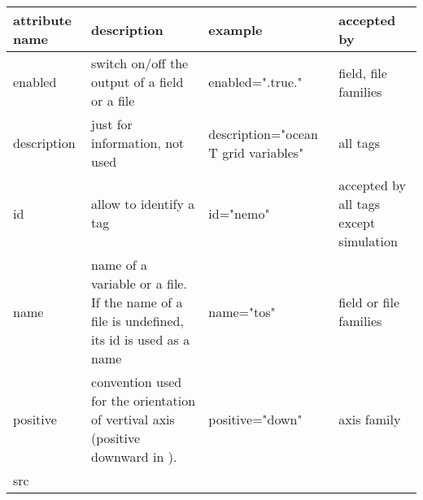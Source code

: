 \documentclass[../tex_main/NEMO_manual]{subfiles}
\begin{document}
\begin{table} \scriptsize
	\begin{tabularx}{\textwidth}{|l|X|X|X|} \hline
		attribute name                                                                                       &
		description                                                                                          &
		example                                                                                              &
		accepted by                            \\ \hline \hline
		enabled                                                                                              &
		switch on/off the output of a field or a file                                                        &
		enabled=".true."                                                                                     &
		field, file families                   \\ \hline
		description                                                                                          &
		just for information, not used                                                                       &
		description="ocean T grid variables"                                                                 &
		all tags                               \\ \hline
		id                                                                                                   &
		allow to identify a tag                                                                              &
		id="nemo"                                                                                            &
		accepted by all tags except simulation \\ \hline
		name                                                                                                 &
		name of a variable or a file. If the name of a file is undefined, its id is used as a name           &
		name="tos"                                                                                           &
		field or file families                 \\ \hline
		positive                                                                                             &
		convention used for the orientation of vertival axis (positive downward in \NEMO).                   &
		positive="down"                                                                                      &
		axis family                            \\ \hline
		src                                                                                                  &

\end{tabularx}
\end{table}
\end{document}

